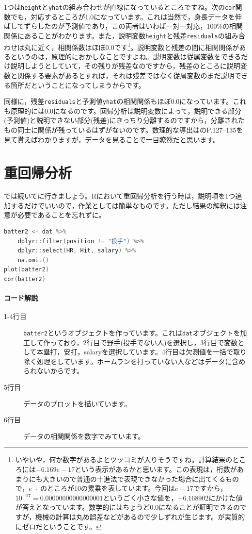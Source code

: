 \documentclass{ltjsbook}
\begin{document}
1つは\verb|height|と\verb|yhat|の組み合わせが直線になっているところですね。次の\verb|cor|関数でも，対応するところが1.0になっています。これは当然で，身長データを伸ばしてずらしたのが予測値であり，この両者はいわば一対一対応，100\%の相関関係にあることがわかります。また，説明変数\verb|height|と残差\verb|residuals|の組み合わせは丸に近く，相関係数はほぼ0.0です\footnote{いやいや，何か数字があるよとツッコミが入りそうですね。計算結果のところには$-6.169e-17$という表示があるかと思います。この表現は，桁数があまりにも大きいので普通の十進法で表現できなかった場合に出てくるもので，$e+$のところが10の累乗を表しています。今回は$e-17$ですから，$10^{-17}=0.00000000000000001$というごく小さな値を，$-6.168902$にかけた値が答えとなっています。数学的にはちょうど$0.0$になることが証明できるのですが，機械の計算は丸め誤差などがあるので少しずれが生じます。が実質的にゼロだということです。}。説明変数と残差の間に相関関係があるというのは，原理的におかしなことですよね。説明変数は従属変数をできるだけ説明しようとしていて，その残りが残差なのですから，残差のところに説明変数と関係する要素があるとすれば，それは残差ではなく従属変数のまだ説明できる箇所だということになってしまうからです。

同様に，残差\verb|residuals|と予測値\verb|yhat|の相関関係もほぼ0.0になっています。これも原理的には$0.0$になるのです。回帰分析は説明変数によって，説明できる部分(予測値)と説明できない部分(残差)にきっちり分離するのですから，分離されたもの同士に関係が残っているはずがないのです。数理的な導出は\textcite{kosugi2018}のP.127--135を見て貰えばわかりますが，データを見ることで一目瞭然だと思います。

\section{重回帰分析}
では続いてに行きましょう。Rにおいて重回帰分析を行う時は，説明項を1つ追加するだけでいいので，作業としては簡単なものです。ただし結果の解釈には注意が必要であることを忘れずに。

\begin{lstlisting}[language=c++,label={code:09_07},caption={重回帰分析のデータを作って可視化}]
batter2 <- dat %>%
	dplyr::filter(position != "投手") %>%
	dplyr::select(HR, Hit, salary) %>%
	na.omit()
plot(batter2)
cor(batter2)

\end{lstlisting}

\paragraph{コード解説}
\begin{description}
	\item[1-4行目]\texttt{batter2}というオブジェクトを作っています。これは\texttt{dat}オブジェクトを加工して作っており，2行目で野手(投手でない人)を選択し，3行目で変数として本塁打，安打，salaryを選択しています。4行目は欠測値を一括で取り除く処理をしています。ホームランを打っていない人などはデータに含められないからです。
	\item[5行目] データのプロットを描いています。
	\item[6行目] データの相関関係を数字でみています。
\end{description}
\end{document}
